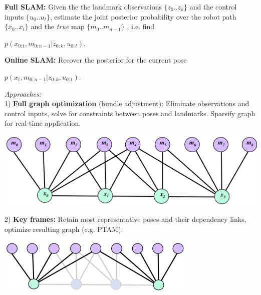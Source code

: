 \documentclass[landscape]{article}
\newcommand{\vmspace}{\vspace{-7pt}}
\newcommand{\vpspace}{\vspace{5pt}}
\begin{document}
\begin{multicols}{3}
\begin{minipage}{\columnwidth}
  \textbf{Full SLAM:} Given the the landmark observations $  \{z_0..z_k\}$ and
  the control inputs $\{u_0..u_t\}$, estimate the joint posterior
  probability over the robot path $\{x_0..x_t\}$ and the \textit{true} map
  $\{m_0..m_{n-1}\}$ , i.e. find
  \vmspace
  \begin{center}
    $
    p(x_{0:t}, m_{0:n-1}| z_{0:k}, u_{0:t}).
    $
  \end{center}
\end{minipage}

\vpspace


\begin{minipage}{\columnwidth}
  \textbf{Online SLAM:} Recover the posterior for the current pose
  \vmspace
  \begin{center}
    $
    p(x_{t}, m_{0:n-1}| z_{0:k}, u_{0:t}).
    $
  \end{center}
\end{minipage}

\begin{minipage}{\columnwidth}
  \textit{Approaches:}\\
  1) \textbf{Full graph optimization} (bundle adjustment): Eliminate
  observations and control inputs, solve for constraints between poses and
  landmarks. Sparsify graph for real-time application.
  \vspace{-17pt}
  \begin{center}
    \includegraphics[width=0.5\columnwidth]{img/10_FullGraphSLAM.png}
  \end{center}
\end{minipage}

\begin{minipage}{\columnwidth}
  2) \textbf{Key frames:} Retain most representative poses and their dependency
  links, optimize resulting graph (e.g. PTAM).
  \vspace{-8pt}
  \begin{center}
    \includegraphics[width=0.5\columnwidth]{img/10_KeyframeSLAM.png}
  \end{center}
\end{minipage}


\end{multicols}
\end{document}
